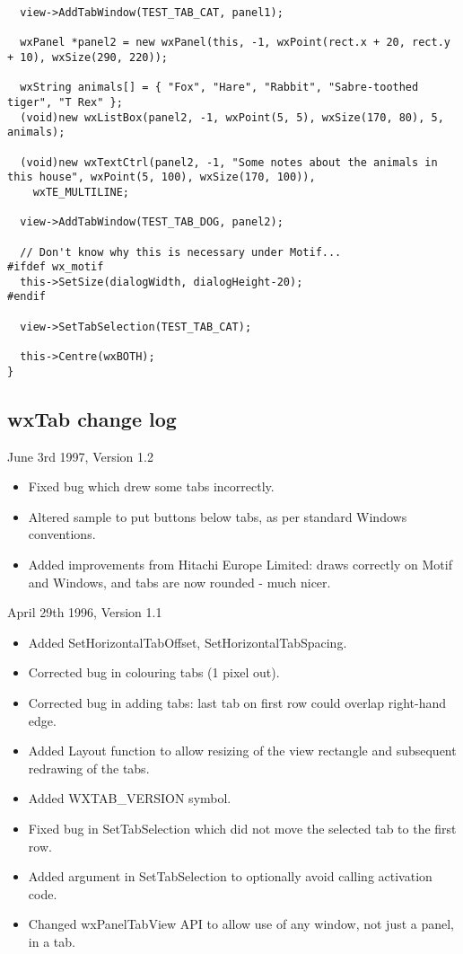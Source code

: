 {\begin{verbatim}
  view->AddTabWindow(TEST_TAB_CAT, panel1);

  wxPanel *panel2 = new wxPanel(this, -1, wxPoint(rect.x + 20, rect.y + 10), wxSize(290, 220));

  wxString animals[] = { "Fox", "Hare", "Rabbit", "Sabre-toothed tiger", "T Rex" };
  (void)new wxListBox(panel2, -1, wxPoint(5, 5), wxSize(170, 80), 5, animals);

  (void)new wxTextCtrl(panel2, -1, "Some notes about the animals in this house", wxPoint(5, 100), wxSize(170, 100)),
    wxTE_MULTILINE;
  
  view->AddTabWindow(TEST_TAB_DOG, panel2);
  
  // Don't know why this is necessary under Motif...
#ifdef wx_motif
  this->SetSize(dialogWidth, dialogHeight-20);
#endif

  view->SetTabSelection(TEST_TAB_CAT);
  
  this->Centre(wxBOTH);
}
\end{verbatim}
}

\subsection{wxTab change log}

June 3rd 1997, Version 1.2

\begin{itemize}\itemsep=0pt
\item Fixed bug which drew some tabs incorrectly.
\item Altered sample to put buttons below tabs, as per standard
Windows conventions.
\item Added improvements from Hitachi Europe Limited: draws correctly
on Motif and Windows, and tabs are now rounded - much nicer.
\end{itemize}

April 29th 1996, Version 1.1

\begin{itemize}\itemsep=0pt
\item Added SetHorizontalTabOffset, SetHorizontalTabSpacing.
\item Corrected bug in colouring tabs (1 pixel out).
\item Corrected bug in adding tabs: last tab on first row could overlap right-hand
edge.
\item Added Layout function to allow resizing of the view rectangle and subsequent redrawing
of the tabs.
\item Added WXTAB\_VERSION symbol.
\item Fixed bug in SetTabSelection which did not move the selected tab to the first row.
\item Added argument in SetTabSelection to optionally avoid calling activation code.
\item Changed wxPanelTabView API to allow use of any window, not just a panel, in a tab.
\end{itemize}

